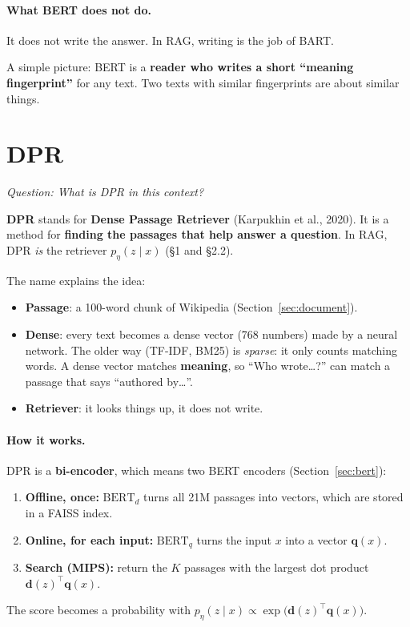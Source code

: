 \documentclass[11pt]{article}
\newcommand{\question}[1]{\noindent\textit{Question: #1}\par\medskip}
\begin{document}
\paragraph{What BERT does not do.}
It does not write the answer. In RAG, writing is the job of BART.

A simple picture: BERT is a \textbf{reader who writes a short ``meaning fingerprint''} for any text. Two texts with similar fingerprints are about similar things.

\section{DPR}\label{sec:dpr}
\question{What is DPR in this context?}

\textbf{DPR} stands for \textbf{Dense Passage Retriever} (Karpukhin et al., 2020). It is a method for \textbf{finding the passages that help answer a question}. In RAG, DPR \emph{is} the retriever $p_\eta(z \mid x)$ (\S1 and \S2.2).

The name explains the idea:
\begin{itemize}[nosep]
  \item \textbf{Passage}: a 100-word chunk of Wikipedia (Section~\ref{sec:document}).
  \item \textbf{Dense}: every text becomes a dense vector (768 numbers) made by a neural network. The older way (TF-IDF, BM25) is \emph{sparse}: it only counts matching words. A dense vector matches \textbf{meaning}, so ``Who wrote\dots?'' can match a passage that says ``authored by\dots''.
  \item \textbf{Retriever}: it looks things up, it does not write.
\end{itemize}

\paragraph{How it works.} DPR is a \textbf{bi-encoder}, which means two BERT encoders (Section~\ref{sec:bert}):
\begin{enumerate}[nosep]
  \item \textbf{Offline, once:} $\mathrm{BERT}_d$ turns all 21M passages into vectors, which are stored in a FAISS index.
  \item \textbf{Online, for each input:} $\mathrm{BERT}_q$ turns the input $x$ into a vector $\mathbf{q}(x)$.
  \item \textbf{Search (MIPS):} return the $K$ passages with the largest dot product $\mathbf{d}(z)^{\top}\mathbf{q}(x)$.
\end{enumerate}
The score becomes a probability with $p_\eta(z \mid x) \propto \exp\!\big(\mathbf{d}(z)^{\top}\mathbf{q}(x)\big)$.
\end{document}
